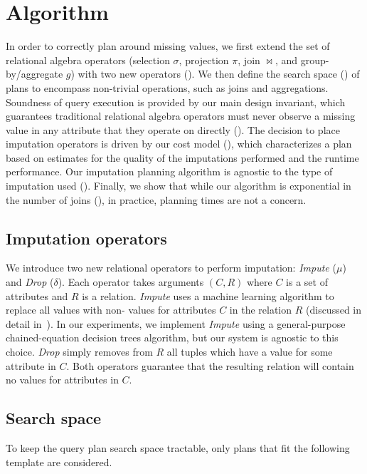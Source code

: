 \section{Algorithm}
In order to correctly plan around missing values, we first extend the set of relational algebra operators (selection $\sigma$, projection $\pi$, join $\bowtie$, and group-by/aggregate $g$) 
with two new operators (). We then define the search space () of plans to encompass non-trivial operations, such as joins and 
aggregations. Soundness of query execution is provided by our main design invariant, which guarantees traditional relational
algebra operators must never observe a missing value in any attribute that they operate on directly (). 
The decision to place imputation operators is driven by our cost model (), which characterizes a plan based on estimates for the 
quality of the imputations performed and the runtime performance. Our imputation planning algorithm is
agnostic to the type of imputation used (). Finally, we show
that while our algorithm is exponential in the number of joins (), in practice, planning times are not a concern.


\subsection{Imputation operators}
\label{sec:operators}
We introduce two new relational operators to perform imputation: \textit{Impute} ($\mu$) and
\textit{Drop} ($\delta$). Each operator takes arguments $(C, R)$ where $C$ is a set of
attributes and $R$ is a relation. \textit{Impute} uses a machine learning algorithm to
replace all \nullv{} values with non-\nullv{} values for attributes $C$ in the relation $R$ (discussed in detail in~).
In our experiments, we implement \textit{Impute} using a general-purpose chained-equation decision trees algorithm, but our system is agnostic to this choice.
\textit{Drop} simply removes from $R$ all tuples which have a \nullv{} value for some attribute in $C$.
Both operators guarantee that the resulting relation will contain no \nullv{} values for
attributes in $C$.  

\subsection{Search space}
\label{sec:search-space}
To keep the query plan search space tractable, only plans that fit the following template are considered.

